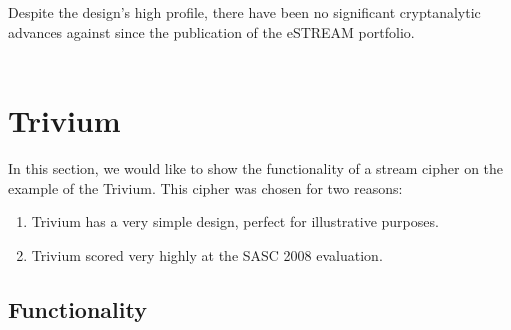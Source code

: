 Despite the design's high profile, there have been no significant cryptanalytic advances against  since the publication of the eSTREAM portfolio. \\\\

\clearpage

\section{Trivium}

In this section, we would like to show the functionality of a stream cipher on the example of the Trivium. This cipher was chosen for two reasons:
\begin{enumerate}
	\setlength\itemsep{0.1em}
	\item Trivium has a very simple design, perfect for illustrative purposes.
	\item Trivium scored very highly at the SASC 2008 evaluation.
\end{enumerate}

\vspace{0.3cm}

\subsection{Functionality}

